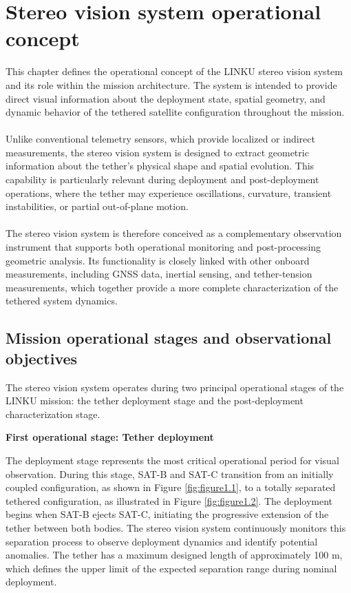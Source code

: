 \chapter{Stereo vision system operational concept}

This chapter defines the operational concept of the LINKU stereo vision system and its role within the mission architecture. The system is intended to provide direct visual information about the deployment state, spatial geometry, and dynamic behavior of the tethered satellite configuration throughout the mission.
\\\\
Unlike conventional telemetry sensors, which provide localized or indirect measurements, the stereo vision system is designed to extract geometric information about the tether's physical shape and spatial evolution. This capability is particularly relevant during deployment and post-deployment operations, where the tether may experience oscillations, curvature, transient instabilities, or partial out-of-plane motion.
\\\\
The stereo vision system is therefore conceived as a complementary observation instrument that supports both operational monitoring and post-processing geometric analysis. Its functionality is closely linked with other onboard measurements, including GNSS data, inertial sensing, and tether-tension measurements, which together provide a more complete characterization of the tethered system dynamics.

\section{Mission operational stages and observational objectives}

The stereo vision system operates during two principal operational stages of the LINKU mission: the tether deployment stage and the post-deployment characterization stage.

\vspace{0.5cm}
\noindent \textbf{First operational stage: Tether deployment}
\vspace{0.2cm}

The deployment stage represents the most critical operational period for visual observation. During this stage, SAT-B and SAT-C transition from an initially coupled configuration, as shown in Figure \ref{fig:figure1.1}, to a totally separated tethered configuration, as illustrated in Figure \ref{fig:figure1.2}. The deployment begins when SAT-B ejects SAT-C, initiating the progressive extension of the tether between both bodies. The stereo vision system continuously monitors this separation process to observe deployment dynamics and identify potential anomalies. The tether has a maximum designed length of approximately 100 m, which defines the upper limit of the expected separation range during nominal deployment.
\newpage
\clearpage

